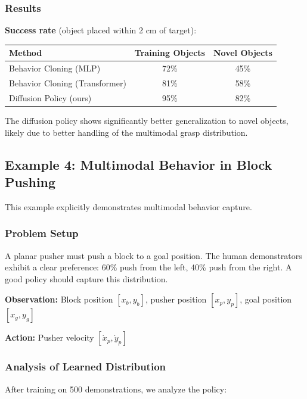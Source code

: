 \subsubsection{Results}

\textbf{Success rate} (object placed within 2 cm of target):
\begin{center}
\begin{tabular}{lcc}
\toprule
\textbf{Method} & \textbf{Training Objects} & \textbf{Novel Objects} \\
\midrule
Behavior Cloning (MLP) & 72\% & 45\% \\
Behavior Cloning (Transformer) & 81\% & 58\% \\
Diffusion Policy (ours) & 95\% & 82\% \\
\bottomrule
\end{tabular}
\end{center}

The diffusion policy shows significantly better generalization to novel objects, likely due to better handling of the multimodal grasp distribution.

\subsection{Example 4: Multimodal Behavior in Block Pushing}
\label{subsec:example_block_pushing}

This example explicitly demonstrates multimodal behavior capture.

\subsubsection{Problem Setup}

A planar pusher must push a block to a goal position. The human demonstrators exhibit a clear preference: 60\% push from the left, 40\% push from the right. A good policy should capture this distribution.

\textbf{Observation:} Block position $[x_b, y_b]$, pusher position $[x_p, y_p]$, goal position $[x_g, y_g]$

\textbf{Action:} Pusher velocity $[\dot{x}_p, \dot{y}_p]$

\subsubsection{Analysis of Learned Distribution}

After training on 500 demonstrations, we analyze the policy:


